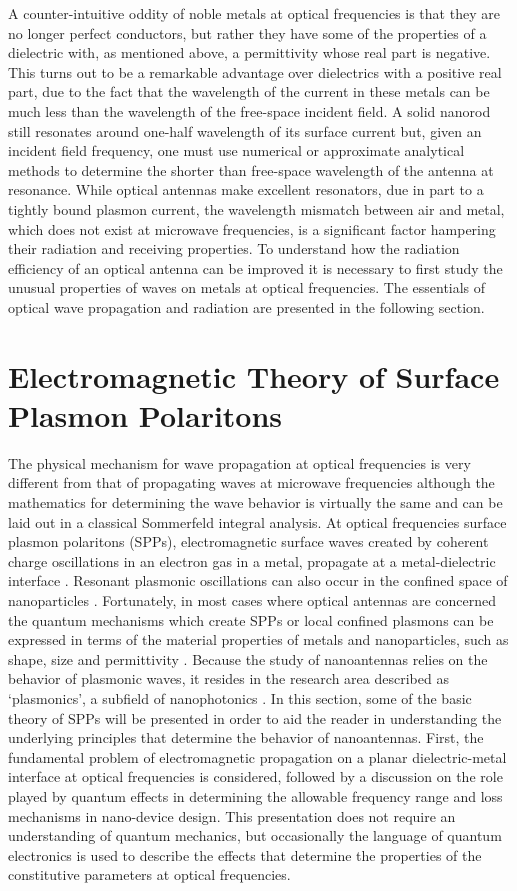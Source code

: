\documentclass[11pt]{article}
\begin{document}
A counter-intuitive oddity of noble metals at optical frequencies is that they are no longer perfect conductors, but rather they have some of the properties of a dielectric with, as mentioned above, a permittivity whose real part is negative. This turns out to be a remarkable advantage over dielectrics with a positive real part, due to the fact that the wavelength of the current in these metals can be much less than the wavelength of the free-space incident field. A solid nanorod still resonates around one-half wavelength of its surface current but, given an incident field frequency, one must use numerical or approximate analytical methods to determine the shorter than free-space wavelength of the antenna at resonance. While optical antennas make excellent resonators, due in part to a tightly bound plasmon current, the wavelength mismatch between air and metal, which does not exist at microwave frequencies, is a significant factor hampering their radiation and receiving properties. To understand how the radiation efficiency of an optical antenna can be improved it is necessary to first study the unusual properties of waves on metals at optical frequencies. The essentials of optical wave propagation and radiation are presented in the following section.
\section{Electromagnetic Theory of Surface Plasmon Polaritons}
%
The physical mechanism for wave propagation at optical frequencies is very different from that of propagating waves at microwave frequencies although the mathematics for determining the wave behavior is virtually the same and can be laid out in a classical Sommerfeld integral analysis. At optical frequencies surface plasmon polaritons (SPPs), electromagnetic surface waves created by coherent charge oscillations in an electron gas in a metal, propagate at a metal-dielectric interface \cite{Ritchie1957,otto1976spectroscopy, Raether1988}. Resonant plasmonic oscillations can also occur in the confined space of nanoparticles \cite{Nie1997}. Fortunately, in most cases where optical antennas are concerned the quantum mechanisms which create SPPs or local confined plasmons can be expressed in terms of the material properties of metals and nanoparticles, such as shape, size and permittivity \cite{Kelly2003}.  Because the study of nanoantennas relies on the behavior of
plasmonic waves, it resides in the research area described as `plasmonics', a
subfield of nanophotonics \cite{Maier2005, Park2009}. In this section, some of the basic theory of SPPs will be presented in order to aid the reader in understanding the underlying principles that determine the behavior of nanoantennas. First, the fundamental problem of electromagnetic propagation on a planar dielectric-metal interface at optical frequencies is considered, followed by a discussion on the role played by quantum effects in determining the allowable frequency range and loss mechanisms in nano-device design. This presentation does not require an understanding of quantum mechanics, but occasionally the language of quantum electronics is used to describe the effects that determine the properties of the constitutive parameters at optical frequencies.
%
%
%
%
\end{document}
